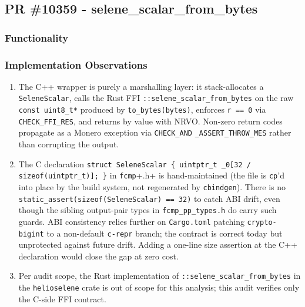 \documentclass[12pt,titlepage,table]{article}
\begin{document}
\subsection{PR \#10359 - selene\_scalar\_from\_bytes}
\subsubsection{Functionality}

\subsubsection{Implementation Observations}
\begin{enumerate}
    \item The C++ wrapper is purely a marshalling layer: it stack-allocates a \verb+SeleneScalar+, calls the Rust FFI \verb+::selene_scalar_from_bytes+ on the raw \verb+const uint8_t*+ produced by \verb+to_bytes(bytes)+, enforces \verb+r == 0+ via \verb+CHECK_FFI_RES+, and returns by value with NRVO.  Non-zero return codes propagate as a Monero exception via \verb+CHECK_AND+ \verb+_ASSERT_THROW_MES+ rather than corrupting the output. 
    \item The C declaration \verb!struct SeleneScalar { uintptr_t _0[32 / sizeof(uintptr_t)]; }! in \verb+fcmp++.h+ is hand-maintained (the file is \verb+cp+'d into place by the build system, not regenerated by \verb+cbindgen+).  There is no \verb!static_assert(sizeof(SeleneScalar) == 32)! to catch ABI drift, even though the sibling output-pair types in \verb+fcmp_pp_types.h+ do carry such guards.  ABI consistency relies further on \verb+Cargo.toml+ patching \verb+crypto-bigint+ to a non-default \verb+c-repr+ branch; the contract is correct today but unprotected against future drift.  Adding a one-line size assertion at the C++ declaration would close the gap at zero cost.
    \item Per audit scope, the Rust implementation of \verb+::selene_scalar_from_bytes+ in the \verb+helioselene+ crate is out of scope for this analysis; this audit verifies only the C-side FFI contract.
\end{enumerate}
\end{document}
